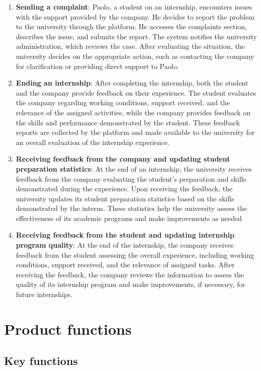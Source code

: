 \begin{enumerate}[label=\textbf{S\arabic* -}]
    \item \textbf {Sending a complaint}: 
    Paolo, a student on an internship, encounters issues with the support provided by the company. 
    He decides to report the problem to the university through the platform. 
    He accesses the complaints section, describes the issue, and submits the report. 
    The system notifies the university administration, which reviews the case. 
    After evaluating the situation, the university decides on the appropriate action, such as contacting the company for clarification or providing direct support to Paolo.
    \item \textbf {Ending an internship}: 
    After completing the internship, both the student and the company provide feedback on their experience. 
    The student evaluates the company regarding working conditions, support received, and the relevance of the assigned activities, while the company provides feedback on the skills and performance demonstrated by the student. 
    These feedback reports are collected by the platform and made available to the university for an overall evaluation of the internship experience.
    \item \textbf {Receiving feedback from the company and updating student preparation statistics}:
    At the end of an internship, the university receives feedback from the company evaluating the student's preparation and skills demonstrated during the experience. 
    Upon receiving the feedback, the university updates its student preparation statistics based on the skills demonstrated by the interns. 
    These statistics help the university assess the effectiveness of its academic programs and make improvements as needed
    \item \textbf {Receiving feedback from the student and updating internship program quality}:
    At the end of the internship, the company receives feedback from the student assessing the overall experience, including working conditions, support received, and the relevance of assigned tasks. 
    After receiving the feedback, the company reviews the information to assess the quality of its internship program and make improvements, if necessary, for future internships.
\end{enumerate}

\section{Product functions}

\subsection{Key functions}


